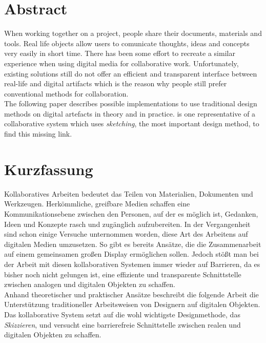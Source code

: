 \begingroup
\let\clearpage\relax
\let\cleardoublepage\relax
\let\cleardoublepage\relax

\chapter*{Abstract}
When working together on a project, people share their documents, materials and tools. Real life objects allow users to comunicate thoughts, ideas and concepts very easily in short time. There has been some effort to recreate a similar experience when using digital media for collaborative work. Unfortunately, existing solutions still do not offer an efficient and transparent interface between real-life and digital artifacts which is the reason why people still prefer conventional methods for collaboration. \\
The following paper describes possible implementations to use traditional design methods on digital artefacts in theory and in practice. \scribbler is one representative of a collaborative system which uses \emph{sketching}, the most important design method, to find this missing link.

\vfill

\chapter*{Kurzfassung}
Kollaboratives Arbeiten bedeutet das Teilen von Materialien, Dokumenten und Werkzeugen. Herkömmliche, greifbare Medien schaffen eine Kommunikationsebene zwischen den Personen, auf der es möglich ist, Gedanken, Ideen und Konzepte rasch und zugänglich aufzubereiten. In der Vergangenheit sind schon einige Versuche unternommen worden, diese Art des Arbeitens auf digitalen Medien umzusetzen. So gibt es bereits Ansätze, die die Zusammenarbeit auf einem gemeinsamen großen Display ermöglichen sollen. Jedoch stößt man bei der Arbeit mit diesen kollaborativen Systemen immer wieder auf Barrieren, da es bisher noch nicht gelungen ist, eine effiziente und transparente Schnittstelle zwischen analogen und digitalen Objekten zu schaffen.\\
Anhand theoretischer und praktischer Ansätze beschreibt die folgende Arbeit die Unterstützung traditioneller Arbeitsweisen von Designern auf digitalen Objekten. Das kollaborative System \scribbler setzt auf die wohl wichtigste Designmethode, das \emph{Skizzieren}, und versucht eine barrierefreie Schnittstelle zwischen realen und digitalen Objekten zu schaffen.

\endgroup			

\vfill